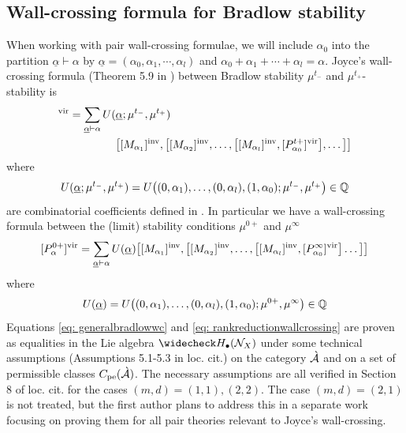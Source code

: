 \documentclass[a4paper, 12pt]{amsart}
\begin{document}


\subsection{Wall-crossing formula for Bradlow stability}
\label{sec: WCformula}
\sloppy When working with pair wall-crossing formulae, we will include $\alpha_0$ into the partition $\underline{\alpha}\vdash \alpha$ by $\underline{\alpha}=(\alpha_0,\alpha_1,\cdots,\alpha_l)$ and $\alpha_0+\alpha_1+\cdots +\alpha_l = \alpha$. Joyce's wall-crossing formula (Theorem 5.9 in \cite{Jo21}) between Bradlow stability $\mu^{t_-}$ and $\mu^{t_+}$-stability is
\begin{align}[P_{\alpha}^{t_{-}}]^\vir=\sum_{\underline{\alpha} \vdash \alpha\label{eq: generalbradlowwc}
}U(&\underline{\alpha}; \mu^{t_-}, \mu^{t_+})\\\nonumber 
&\big[[M_{\alpha_1}]^\inva,\big[[M_{\alpha_2}]^\inva,\ldots, \big[[M_{\alpha_l}]^\inva,[P_{\alpha_0}^{t+}]^\vir \big],\ldots \big]\big]\label{eq: generalbradlowwc}
\end{align}
where
\[U(\underline{\alpha}; \mu^{t_-}, \mu^{t_+})=U\big((0,\alpha_1), \ldots, (0, \alpha_l), (1, \alpha_0); \mu^{t_-},  \mu^{t_+}\big)\in {\mathbb{Q}}\]
are combinatorial coefficients defined in \cite[Section 3.2]{Jo21}. In particular we have a wall-crossing formula between the (limit) stability conditions $\mu^{0+}$ and $\mu^\infty$ 
\begin{equation}
\label{eq: rankreductionwallcrossing}[P_{\alpha}^{0+}]^{\mathrm{vir}}=\sum_{\underline{\alpha}\vdash \alpha
}U(\underline{\alpha})
\big[[M_{\alpha_1}]^{\mathrm{inv}},\big[[M_{\alpha_2}]^{\mathrm{inv}},\ldots, \big[[M_{\alpha_l}]^{\mathrm{inv}},[P_{\alpha_0}^\infty]^{\mathrm{vir}} \big]\ldots \big]\big]
\end{equation}
where
\[U(\underline{\alpha})=U\big((0,\alpha_1), \ldots, (0, \alpha_l), (1, \alpha_0); \mu^{0+}, \mu^\infty\big)\in {\mathbb{Q}}\]
Equations \eqref{eq: generalbradlowwc} and \eqref{eq: rankreductionwallcrossing} are proven as equalities in the Lie algebra $\widecheck H_\bullet(\CN_X)$ under some technical assumptions (Assumptions 5.1-5.3 in loc. cit.) on the category $\grave{{\mathcal A}}$ and on a set of permissible classes $C_{\textup{pe}}(\grave{{\mathcal A}})$. The necessary assumptions are all verified in Section 8 of loc. cit. for the cases $(m,d)=(1,1), (2,2)$. The case $(m,d)=(2,1)$ is not treated, but the first author plans to address this in a separate work focusing on proving them for all pair theories relevant to Joyce's wall-crossing. 
\end{document}
